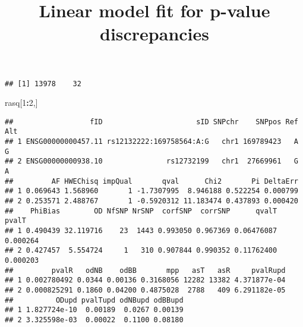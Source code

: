 \documentclass[]{article}
\title{Linear model fit for p-value discrepancies}
\author{}
\date{}
\newenvironment{Shaded}{\begin{snugshade}}{\end{snugshade}}
\newcommand{\KeywordTok}[1]{\textcolor[rgb]{0.13,0.29,0.53}{\textbf{#1}}}
\newcommand{\DecValTok}[1]{\textcolor[rgb]{0.00,0.00,0.81}{#1}}
\newcommand{\StringTok}[1]{\textcolor[rgb]{0.31,0.60,0.02}{#1}}
\newcommand{\CommentTok}[1]{\textcolor[rgb]{0.56,0.35,0.01}{\textit{#1}}}
\newcommand{\OperatorTok}[1]{\textcolor[rgb]{0.81,0.36,0.00}{\textbf{#1}}}
\newcommand{\NormalTok}[1]{#1}
\begin{document}
\maketitle

\begin{Shaded}
\end{Shaded}

\begin{verbatim}
## [1] 13978    32
\end{verbatim}

\begin{Shaded}
\begin{Highlighting}[]
\NormalTok{rasq[}\DecValTok{1}\OperatorTok{:}\DecValTok{2}\NormalTok{,]}
\end{Highlighting}
\end{Shaded}

\begin{verbatim}
##                  fID                      sID SNPchr    SNPpos Ref Alt
## 1 ENSG00000000457.11 rs12132222:169758564:A:G   chr1 169789423   A   G
## 2 ENSG00000000938.10               rs12732199   chr1  27669961   G   A
##         AF HWEChisq impQual       qval      Chi2       Pi DeltaErr
## 1 0.069643 1.568960       1 -1.7307995  8.946188 0.522254 0.000799
## 2 0.253571 2.488767       1 -0.5920312 11.183474 0.437893 0.000420
##    PhiBias        OD NfSNP NrSNP  corfSNP  corrSNP      qvalT    pvalT
## 1 0.490439 32.119716    23  1443 0.993050 0.967369 0.06476087 0.000264
## 2 0.427457  5.554724     1   310 0.907844 0.990352 0.11762400 0.000203
##         pvalR   odNB    odBB       mpp   asT   asR     pvalRupd
## 1 0.002780492 0.0344 0.00136 0.3168056 12282 13382 4.371877e-04
## 2 0.000825291 0.1860 0.04200 0.4875028  2788   409 6.291182e-05
##          ODupd pvalTupd odNBupd odBBupd
## 1 1.827724e-10  0.00189  0.0267 0.00139
## 2 3.325598e-03  0.00022  0.1100 0.08180
\end{verbatim}
\end{document}
